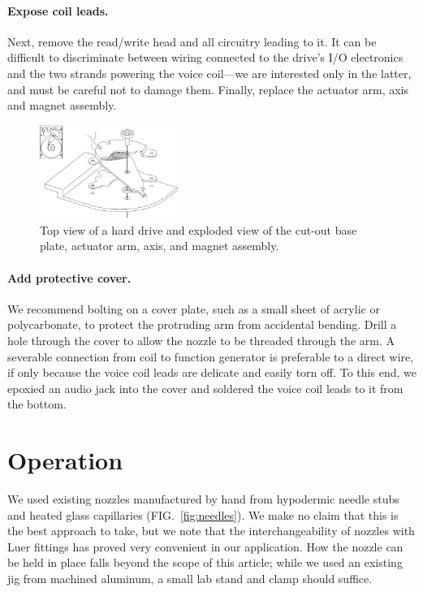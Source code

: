 \documentclass[aip,rsi,reprint,graphicx]{revtex4-1} %
\begin{document}
\paragraph{Expose coil leads.} Next, remove the read/write head and all
circuitry leading to it. It can be difficult to discriminate between wiring
connected to the drive's I/O electronics and the two strands powering the voice
coil---we are interested only in the latter, and must be careful not to damage
them. Finally, replace the actuator arm, axis and magnet assembly.
\begin{figure}
\centering
\includegraphics[width=0.4\textwidth]{hdg_images/dropletgenerator_exploded.pdf}
\caption{Top view of a hard drive and exploded view of the cut-out base
plate, actuator arm, axis, and magnet assembly. \label{fig:designschematic}}
\end{figure}
\paragraph{Add protective cover.} We recommend bolting on a cover plate, such
as a small sheet of acrylic or polycarbonate, to protect the protruding arm from
accidental bending. Drill a hole through the cover to allow the nozzle to be
threaded through the arm. A severable
connection from coil to function generator is preferable to a direct wire, if
only because the voice coil leads are delicate and easily torn off. To this end, we epoxied
an audio jack into the cover and soldered the voice coil leads to it from the
bottom. 

\section{Operation}
We used existing nozzles manufactured by hand from hypodermic needle stubs and
heated glass capillaries (FIG.~\ref{fig:needles}). We make no claim that this is
the best approach to take, but we note that the interchangeability of nozzles
with Luer fittings has proved very convenient in our application. How the nozzle
can be held in place falls beyond the scope of this article; while we used an
existing jig from machined aluminum, a small lab stand and clamp should
suffice.
\end{document}
